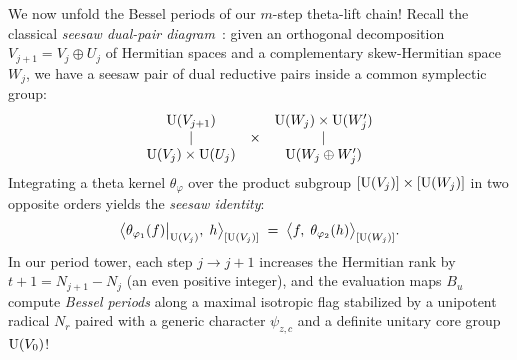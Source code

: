 We now unfold the Bessel periods of our $m$-step theta-lift chain! Recall the classical \emph{seesaw dual-pair diagram}~\cite{Kudla1994,PSR1987}: given an orthogonal decomposition $V_{j+1} = V_j \oplus U_j$ of Hermitian spaces and a complementary skew-Hermitian space $W_j$, we have a seesaw pair of dual reductive pairs inside a common symplectic group:
\[
  \begin{array}{ccc}
    \mathrm{U}(V_{j+1}) & & \mathrm{U}(W_j) \times \mathrm{U}(W_j') \\
    \vert & \times & \vert \\
    \mathrm{U}(V_j) \times \mathrm{U}(U_j) & & \mathrm{U}(W_j \oplus W_j')
  \end{array}
\]
Integrating a theta kernel $\theta_{\varphi}$ over the product subgroup $[\mathrm{U}(V_j)] \times [\mathrm{U}(W_j)]$ in two opposite orders yields the \emph{seesaw identity}:
\begin{equation}
\label{eq:11:seesaw-basic}
  \bigl\langle \theta_{\varphi_1}(f)\big|_{\mathrm{U}(V_j)},\; h \bigr\rangle_{[\mathrm{U}(V_j)]}
  \;=\; \bigl\langle f,\; \theta_{\varphi_2}(h) \bigr\rangle_{[\mathrm{U}(W_j)]}.
\end{equation}
In our period tower, each step $j \to j + 1$ increases the Hermitian rank by $t + 1 = N_{j+1} - N_j$ (an even positive integer), and the evaluation maps $B_u$ compute \emph{Bessel periods} along a maximal isotropic flag stabilized by a unipotent radical $N_r$ paired with a generic character $\psi_{z, c}$ and a definite unitary core group $\mathrm{U}(V_0)$!

